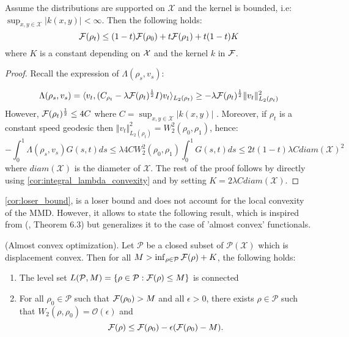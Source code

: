 %
\begin{corollary}
\label{cor:loser_bound}Assume the distributions are supported on
$\mathcal{X}$ and the kernel is bounded, i.e: $\sup_{x,y\in\mathcal{X}}\vert k(x,y)\vert<\infty$.
Then the following holds:
\begin{equation}
{{\mathcal F}}(\rho_{t})\leq(1-t){{\mathcal F}}(\rho_{0})+t{{\mathcal F}}(\rho_{1})+t(1-t)K
\end{equation}
where $K$ is a constant depending on ${{\mathcal X}}$ and the kernel $k$ in ${{\mathcal F}}$.
\end{corollary}
%
\begin{proof}
Recall the expression of $\Lambda(\rho_{s},v_{s}):$

\[
\Lambda(\rho_{s},v_{s})=\langle v_{t},(C_{\rho_{t}}-\lambda {{\mathcal F}}(\rho_{t})^\frac{1}{2} I)v_{t}\rangle_{L_{2}(\rho_{t})}\geq-\lambda {{\mathcal F}}(\rho_{t})^\frac{1}{2}\Vert v_{t}\Vert_{L_{2}(\rho_{t})}^{2}
\]
However, ${{\mathcal F}}(\rho_{t})^\frac{1}{2}\leq4C$ where $C=\sup_{x,y\in\mathcal{X}}\vert k(x,y)\vert$
. Moreover, if $\rho_{t}$ is a constant speed geodesic then $\Vert v_{t}\Vert_{L_{2}(\rho_{t})}^{2}=W_{2}^{2}(\rho_{0},\rho_{1})$,
hence: 
\[
-\int_{0}^{1}\Lambda(\rho_{s},v_{s})G(s,t)ds\leq\lambda 4CW_{2}^{2}(\rho_{0},\rho_{1})\int_{0}^{1}G(s,t)ds\leq2t(1-t)\lambda Cdiam(\mathcal{X})^{2}
\]
where $diam(\mathcal{X})$ is the diameter of $\mathcal{X}$. The rest of the proof follows by directly using \cref{cor:integral_lambda_convexity}
and by setting $K=2\lambda Cdiam(\mathcal{X})$.
\end{proof}
%
\cref{cor:loser_bound}, is a loser bound and does not account for the local
convexity of the MMD. However, it allows to state the following result,
which is inspired from (\cite{Bottou:2017}, Theorem 6.3) but generalizes
it to the case of 'almost convex' functionals.
\begin{proposition}
\label{prop:almost_convex_optimization}
(Almost convex optimization). Let $\mathcal{P}$ be a closed subset
of $\mathcal{P}(\mathcal{X})$ which is displacement convex. Then
for all $M>\inf_{\rho\in\mathcal{P}}{{\mathcal F}}(\rho)+K$, the following
holds:
\end{proposition}
\begin{enumerate}
\item The level set $L(\mathcal{P},M)=\{\rho\in\mathcal{P}:{{\mathcal F}}(\rho)\leq M\}$
is connected
\item For all $\rho_{0}\in\mathcal{P}$ such that ${{\mathcal F}}(\rho_0)>M$
and all $\epsilon>0$, there exists $\rho\in\mathcal{P}$ such that
$W_{2}(\rho,\rho_{0})=\mathcal{O}(\epsilon)$ and
\[
{{\mathcal F}}(\rho)\leq {{\mathcal F}}(\rho_{0})-\epsilon({{\mathcal F}}(\rho_{0})-M).
\]
\end{enumerate}
